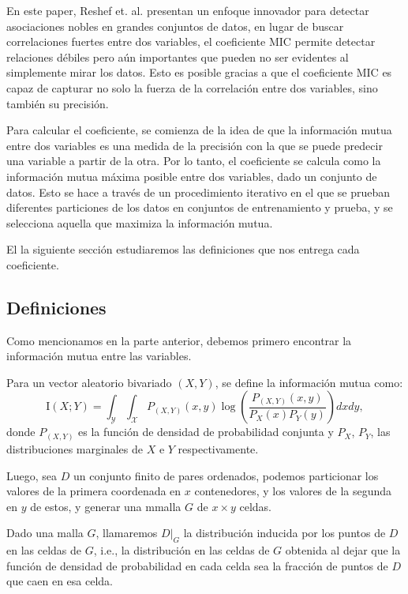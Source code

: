         En este paper, Reshef et. al. presentan un enfoque innovador para detectar asociaciones nobles en grandes conjuntos de datos, en lugar de buscar correlaciones fuertes entre dos variables, el coeficiente MIC permite detectar relaciones d\'ebiles pero a\'un importantes que pueden no ser evidentes al simplemente mirar los datos. Esto es posible gracias a que el coeficiente MIC es capaz de capturar no solo la fuerza de la correlaci\'on entre dos variables, sino tambi\'en su precisi\'on.
    
        Para calcular el coeficiente, se comienza de la idea de que la informaci\'on mutua entre dos variables es una medida de la precisi\'on con la que se puede predecir una variable a partir de la otra. Por lo tanto, el coeficiente se calcula como la informaci\'on mutua m\'axima posible entre dos variables, dado un conjunto de datos. Esto se hace a trav\'es de un procedimiento iterativo en el que se prueban diferentes particiones de los datos en conjuntos de entrenamiento y prueba, y se selecciona aquella que maximiza la informaci\'on mutua.
    
        El la siguiente secci\'on estudiaremos las definiciones que nos entrega cada coeficiente.
     
    \subsection{Definiciones}
    
        Como mencionamos en la parte anterior, debemos primero encontrar la informaci\'on mutua entre las variables.
    
        \begin{defn}
            Para un vector aleatorio bivariado $(X,Y)$, se define la informaci\'on mutua como:
            $$
            \mathrm{I}(X ; Y)=\int_{\mathcal{Y}} \int_{\mathcal{X}} P_{(X, Y)}(x, y) \log \left(\frac{P_{(X, Y)}(x, y)}{P_{X}(x) P_{Y}(y)}\right)dxdy,
            $$
            donde $P_{(X, Y)}$ es la funci\'on de densidad de probabilidad conjunta y $P_{X}$, $P_{Y}$, las distribuciones marginales de $X$ e $Y$ respectivamente. 
        \end{defn}
    
        Luego, sea $D$ un conjunto finito de pares ordenados, podemos particionar los valores de la primera coordenada en $x$ contenedores, y los valores de la segunda en $y$ de estos, y generar una mmalla $G$ de $x \times y$ celdas.
        
        \begin{defn}
            Dado una malla $G$, llamaremos $D|_G$ la distribuci\'on inducida por los puntos de $D$ en las celdas de $G$, i.e., la distribuci\'on en las celdas de $G$ obtenida al dejar que la funci\'on de densidad de probabilidad en cada celda sea la fracci\'on de puntos de $D$ que caen en esa celda.
        \end{defn}

